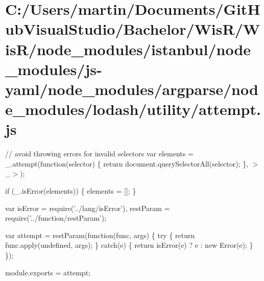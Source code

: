 \hypertarget{_c_1_2_users_2martin_2_documents_2_git_hub_visual_studio_2_bachelor_2_wis_r_2_wis_r_2node_module4e04f3b02586d18bec5cd7485b5185ec}{}\section{C\+:/\+Users/martin/\+Documents/\+Git\+Hub\+Visual\+Studio/\+Bachelor/\+Wis\+R/\+Wis\+R/node\+\_\+modules/istanbul/node\+\_\+modules/js-\/yaml/node\+\_\+modules/argparse/node\+\_\+modules/lodash/utility/attempt.\+js}
// avoid throwing errors for invalid selectors var elements = \+\_\+.\+attempt(function(selector) \{ return document.\+query\+Selector\+All(selector); \}, \textquotesingle{}$>$\+\_\+$>$\textquotesingle{});

if (\+\_\+.\+is\+Error(elements)) \{ elements = \mbox{[}\mbox{]}; \}


\begin{DoxyCodeInclude}
var isError = require(\textcolor{stringliteral}{'../lang/isError'}),
    restParam = require(\textcolor{stringliteral}{'../function/restParam'});

var attempt = restParam(\textcolor{keyword}{function}(func, args) \{
  \textcolor{keywordflow}{try} \{
    \textcolor{keywordflow}{return} func.apply(undefined, args);
  \} \textcolor{keywordflow}{catch}(e) \{
    \textcolor{keywordflow}{return} isError(e) ? e : \textcolor{keyword}{new} Error(e);
  \}
\});

module.exports = attempt;
\end{DoxyCodeInclude}
 